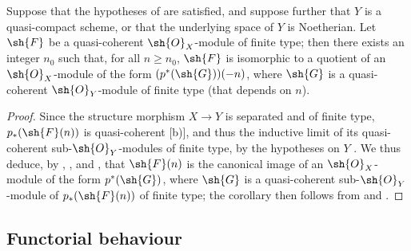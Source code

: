 \begin{corollary}[3.4.8]
\label{II.3.4.8}
Suppose that the hypotheses of  are satisfied, and suppose further that $Y$ is a quasi-compact scheme, or that the underlying space of $Y$ is Noetherian.
Let $\sh{F}$ be a quasi-coherent $\sh{O}_X$-module of finite type;
then there exists an integer $n_0$ such that, for all $n\geq n_0$, $\sh{F}$ is isomorphic to a quotient of an $\sh{O}_X$-module of the form $(p^*(\sh{G}))(-n)$, where $\sh{G}$ is a quasi-coherent $\sh{O}_Y$-module of finite type (that depends on $n$).
\end{corollary}

\begin{proof}
Since the structure morphism $X\to Y$ is separated and of finite type, $p_*(\sh{F}(n))$ is quasi-coherent [b)], and thus the inductive limit of its quasi-coherent sub-$\sh{O}_Y$-modules of finite type, by the hypotheses on $Y$ .
We thus deduce, by , , and , that $\sh{F}(n)$ is the canonical image of an $\sh{O}_X$-module of the form $p^*(\sh{G})$, where $\sh{G}$ is a quasi-coherent sub-$\sh{O}_Y$-module of $p_*(\sh{F}(n))$ of finite type;
the corollary then follows from  and .
\end{proof}


\subsection{Functorial behaviour}
\label{subsection:II.3.5}

